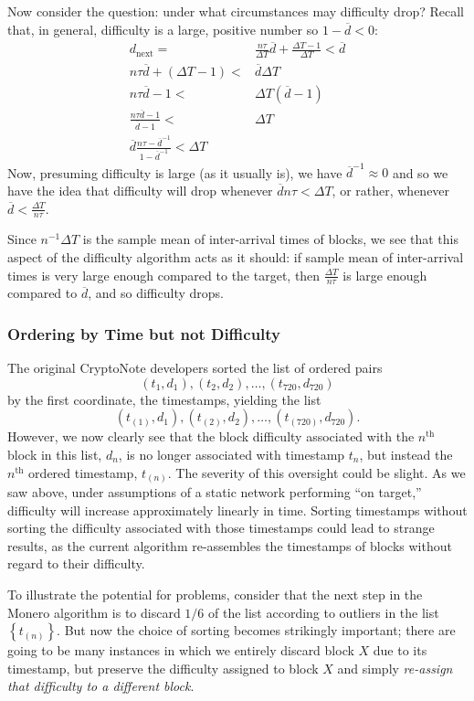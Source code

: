 \documentclass[12pt,english]{mrl}
\theoremstyle{definition}
\numberwithin{equation}{section}
\numberwithin{figure}{section}
\numberwithin{equation}{section}
\numberwithin{equation}{section}
\numberwithin{figure}{section}
\begin{document}
Now consider the question: under what circumstances may difficulty drop? Recall that, in general, difficulty is a large, positive number so $1-\overline{d} < 0$:
\begin{align*}
d_{\text{next}} =& \frac{n\tau}{\Delta T}\overline{d} + \frac{\Delta T - 1}{\Delta T} < \overline{d}\\
n\tau \overline{d} + (\Delta T - 1) <& \overline{d} \Delta T\\
n\tau \overline{d} - 1 <& \Delta T (\overline{d} - 1)\\
\frac{n\tau \overline{d} - 1}{\overline{d} - 1} <& \Delta T\\
\overline{d}\frac{n\tau - \overline{d}^{-1}}{1 - \overline{d}^{-1}} < \Delta T
\end{align*}
Now, presuming difficulty is large (as it usually is), we have $\overline{d}^{-1} \approx 0$ and so we have the idea that difficulty will drop whenever $\overline{d} n \tau < \Delta T$, or rather, whenever $\overline{d} < \frac{\Delta T}{n\tau}$.

Since $n^{-1}\Delta T$ is the sample mean of inter-arrival times of blocks, we see that this aspect of the difficulty algorithm acts as it should: if sample mean of inter-arrival times is very large enough compared to the target, then $\frac{\Delta T}{n\tau}$ is large enough compared to $\overline{d}$, and so difficulty drops. 


\subsubsection{Ordering by Time but not Difficulty}
The original CryptoNote developers sorted the list of ordered pairs
$$(t_1, d_1),(t_2,d_2),\ldots,(t_{720},d_{720})$$
by the first coordinate, the timestamps, yielding the list
$$(t_{(1)},d_1), (t_{(2)},d_2),\ldots,(t_{(720)},d_{720}).$$
However, we now clearly see that the block difficulty associated with the $n^{\text{th}}$ block in this list, $d_n$, is no longer associated with timestamp $t_n$, but instead the $n^{\text{th}}$ ordered timestamp, $t_{(n)}$. The severity of this oversight could be slight. As we saw above, under assumptions of a static network performing ``on target,'' difficulty will increase approximately linearly in time. Sorting timestamps without sorting the difficulty associated with those timestamps could lead to strange results, as the current algorithm re-assembles the timestamps of blocks without regard to their difficulty.

To illustrate the potential for problems, consider that the next step in the Monero algorithm is to discard $1/6$ of the list according to outliers in the list $\left\{t_{(n)}\right\}$. But now the choice of sorting becomes strikingly important; there are going to be many instances in which we entirely discard block $X$ due to its timestamp, but preserve the difficulty assigned to block $X$ and simply \textit{re-assign that difficulty to a different block}.
\end{document}
